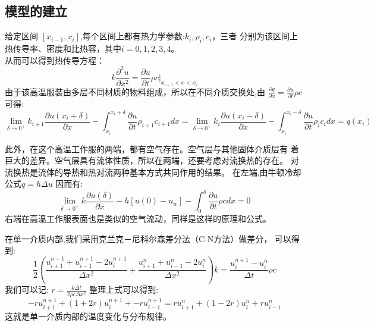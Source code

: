 \documentclass{cumcmthesis}
\begin{document}
        \subsection{模型的建立}
        给定区间 \([x_{i-1},x_i]\),每个区间上都有热力学参数:\(k_i,\rho_i,c_i\)，三者
    分别为该区间上热传导率、密度和比热容，其中\(i=0,1,2,3,4\)。\\
    从而可以得到热传导方程：\cite{2}
    \[k\frac{\partial^2 u}{\partial x^2} = \frac{\partial u}{\partial t}\rho c |_{x_{i-1}<x<x_{i}}\] 
    由于该高温服装由多层不同材质的物料组成，所以在不同介质交换处,由
    \(\frac{\partial{q}}{\partial{x}} = \frac{\partial{u}}{\partial{t}} \rho c \)
    可得:
    \[ 
        \lim_{\delta \to 0^+} 
        k_{i+1 }\frac{\partial{u(x_i+\delta)}}{\partial{x}} 
        -
        \int_{x_i}^{x_i+\delta}\frac{\partial{u}}{\partial{t}} \rho_{i+1} c_{i+1} dx 
        = 
        \lim_{\delta \to 0^+} 
        k_{i} \frac{\partial{u(x_i-\delta)}}{\partial{x}}
        - 
        \int_{x_i}^{x_i-\delta}\frac{\partial{u}}{\partial{t}} \rho_i c_i dx
        =
        q(x_i)
    \]

    此外，在这个高温工作服的两端，都有空气存在。空气层与其他固体介质层有
    着巨大的差异。空气层具有流体性质，所以在两端，还要考虑对流换热的存在。
    对流换热是流体的导热和热对流两种基本方式共同作用的结果。
    在左端,由牛顿冷却公式\(q = h\Delta u\)
    因而有:
    \[
        \lim_{\delta \to 0^+} 
        k\frac{\partial{u(\delta)}}{\partial{x}} 
        - 
        h[u(0) - u_w]
        -
        \int_{0}^{\delta}\frac{\partial{u}}{\partial{t}} \rho c dx 
        = 0
    \]
    右端在高温工作服表面也是类似的空气流动，同样是这样的原理和公式。

    在单一介质内部,我们采用克兰克－尼科尔森差分法（C-N方法）做差分，
    可以得到:
    \[
        \frac{1}{2}
        \left(
            \frac{u_{i+1}^{n+1} + u_{i-1}^{n+1} - 2u_{i}^{n+1} }{\Delta x^2}
            +
            \frac{u_{i+1}^{n} + u_{i-1}^{n} - 2u_{i}^{n} }{\Delta x^2}
        \right)
        k
        =
        \frac{ u_{i}^{n+1} - u_{i}^{n} }{\Delta t} \rho c
    \]
    我们可以记:
    \( r = \frac{k \Delta t}{ 2 \rho c \Delta x^2 } \)
    整理上式可以得到:
    \[
        -ru_{i+1}^{n+1} + (1+2r)u_{i}^{n+1} + -ru_{i-1}^{n+1}
        =
        ru_{i+1}^{n} + (1-2r)u_{i}^{n} + ru_{i-1}^{n}
    \]
    这就是单一介质内部的温度变化与分布规律。
\end{document}
